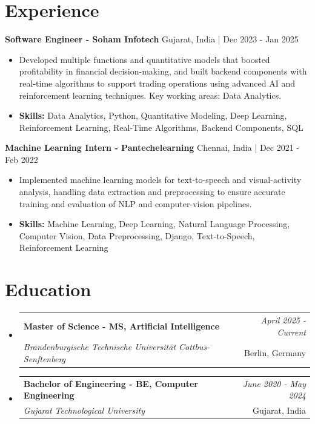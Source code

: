 \documentclass[a4paper,11pt]{article}
\makeatletter
\newcommand{\resumeSubheading}[4]{
\vspace{0.5mm}\item
    \begin{tabular*}{\linewidth}[t]{l@{\extracolsep{\fill}}r}
        \textbf{#1} & \textit{\footnotesize{#4}} \\
        \textit{\footnotesize{#3}} &  \footnotesize{#2}\\
    \end{tabular*}
    \vspace{-2.4mm}
}
\makeatother
\begin{document}
\section{\textbf{Experience}}


\vspace{1mm}
  \textbf{Software Engineer - Soham Infotech} \hfill Gujarat, India | Dec 2023 - Jan 2025
\vspace{-1.5mm} %
\begin{itemize}
  \item Developed multiple functions and quantitative models that boosted profitability in financial decision-making, and built backend components with real-time algorithms to support trading operations using advanced AI and reinforcement learning techniques. Key working areas: Data Analytics.

\vspace{-2mm}
  \item \textbf{Skills:} Data Analytics, Python, Quantitative Modeling, Deep Learning, Reinforcement Learning, Real-Time Algorithms, Backend Components, SQL
\end{itemize}

\vspace{1mm}
  \textbf{Machine Learning Intern - Pantechelearning} \hfill Chennai, India | Dec 2021 - Feb 2022
\vspace{-1.5mm} %
\begin{itemize}
  \item Implemented machine learning models for text-to-speech and visual-activity analysis, handling data extraction and preprocessing to ensure accurate training and evaluation of NLP and computer-vision pipelines.
\vspace{-2mm}
  \item \textbf{Skills:} Machine Learning, Deep Learning, Natural Language Processing, Computer Vision, Data Preprocessing, Django, Text-to-Speech, Reinforcement Learning
\end{itemize}\section{\textbf{Education}}
\vspace{-0.4mm}

\begin{itemize}[leftmargin=0.15in, label={}]
\resumeSubheading
{Master of Science - MS, Artificial Intelligence }{Berlin, Germany}
{Brandenburgische Technische Universität Cottbus-Senftenberg  }{April 2025 - Current}

\vspace{1.0mm} %
\resumeSubheading
{Bachelor of Engineering - BE, Computer Engineering  }{Gujarat, India}
{Gujarat Technological University }{June 2020 - May 2024}

\end{itemize}
\end{document}
